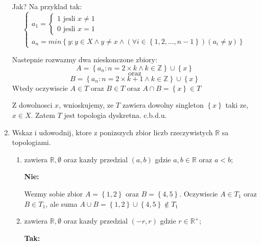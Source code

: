 \documentclass{article}
\begin{document}
\begin{enumerate}
Jak? Na przyklad tak:
$$
\begin{cases}
    a_{1} = \begin{cases} 1 \text{ jesli } x \neq 1 \\ 0 \text{ jesli } x = 1   \end{cases} \\
    a_{n} = min\left\{y: y \in X \land y \neq x \land (\forall i \in \left\{1,2,\dots,n-1\right\})(a_{i} \neq y)\right\}
\end{cases}$$

Nastepnie rozwazmy dwa nieskonczone zbiory:
$$A = \left\{a_{n}: n = 2\times k \land k \in \mathbb{Z}\right\} \cup \left\{x\right\}$$
$$\text{ oraz }$$ 
$$B = \left\{a_{n}: n = 2\times k + 1\land k \in \mathbb{Z}\right\} \cup \left\{x\right\} $$
Wtedy oczywiscie $A \in T$ oraz $B \in T$ oraz $A \cap B = \left\{x\right\} \in T$

Z dowolnosci $x$, wnioskujemy, ze $T$ zawiera dowolny singleton $\left\{x\right\}$ taki ze, $x \in X$. Zatem $T$ jest topologia dyskretna. c.b.d.u. 

\item Wskaz i udowodnij, ktore z ponizszych zbior liczb rzeczywistych $\mathbb{R}$ sa topologiami.

\begin{enumerate}[label={$T_{\arabic*} :$}]
\item zawiera $\mathbb{R}, \emptyset$ oraz kazdy przedzial $(a,b)$ gdzie $a,b \in \mathbb{R}$ oraz $a < b$;

\textbf{Nie:}

Wezmy sobie zbior $A = \left\{ 1,2 \right\}$ oraz $B = \left\{ 4,5 \right\}$. Oczywiscie $A \in T_{1}$ oraz $B \in T_{1}$, ale suma $A \cup B = \left\{ 1,2 \right\} \cup \left\{ 4,5 \right\} \notin T_{1}$
\item zawiera $\mathbb{R}, \emptyset$ oraz kazdy przedzial $(-r,r)$ gdzie $r \in {\mathbb{R}}^{+}$;

\textbf{Tak:}


\end{enumerate}
\end{enumerate}
\end{document}
